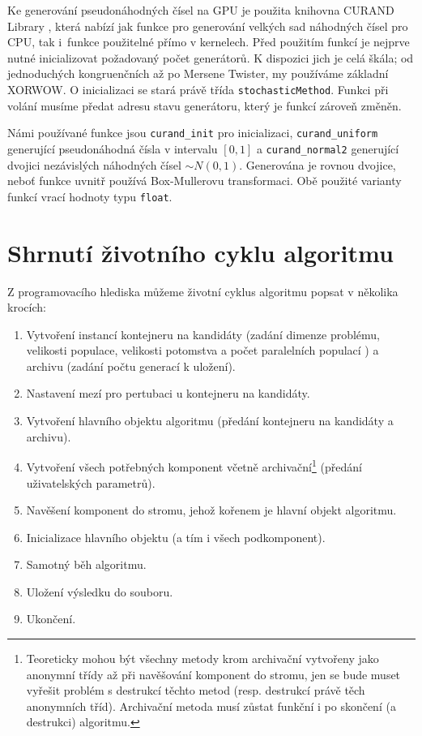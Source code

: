 Ke generování pseudonáhodných čísel na GPU je použita knihovna CURAND Library \cite{CURAND}, která nabízí jak funkce pro generování velkých sad náhodných čísel pro CPU, tak i~funkce použitelné přímo v kernelech. Před použitím funkcí je nejprve nutné inicializovat požadovaný počet generátorů. K dispozici jich je celá škála; od jednoduchých kongruenčních až po Mersene Twister, my používáme základní XORWOW. O inicializaci se stará právě třída \texttt{stochasticMethod}. Funkci při volání musíme předat adresu stavu generátoru, který je funkcí zároveň změněn.

Námi používané funkce jsou \texttt{curand\_init} pro inicializaci, \texttt{curand\_uniform} generující pseudonáhodná čísla v intervalu $[0,1]$ a \texttt{curand\_normal2} generující dvojici nezávislých náhodných čísel $\sim N(0,1)$. Generována je rovnou dvojice, neboť funkce uvnitř používá Box-Mullerovu transformaci. Obě použité varianty funkcí vrací hodnoty typu \texttt{float}.

\section{Shrnutí životního cyklu algoritmu}

Z programovacího hlediska můžeme životní cyklus algoritmu popsat v několika krocích:
\begin{enumerate}
  \item Vytvoření instancí kontejneru na kandidáty (zadání dimenze problému, velikosti populace, velikosti potomstva a počet paralelních populací ) a archivu (zadání počtu generací k uložení).
  \item Nastavení mezí pro pertubaci u kontejneru na kandidáty.
  \item Vytvoření hlavního objektu algoritmu (předání kontejneru na kandidáty a archivu).
  \item Vytvoření všech potřebných komponent včetně archivační\footnote{Teoreticky mohou být všechny metody krom archivační vytvořeny jako anonymní třídy až při navěšování komponent do stromu, jen se bude muset vyřešit problém s destrukcí těchto metod (resp. destrukcí právě těch anonymních tříd). Archivační metoda musí zůstat funkční i po skončení (a destrukci) algoritmu.} (předání uživatelských parametrů).
  \item Navěšení komponent do stromu, jehož kořenem je hlavní objekt algoritmu.
  \item Inicializace hlavního objektu (a tím i všech podkomponent).
  \item Samotný běh algoritmu.
  \item Uložení výsledku do souboru.
  \item Ukončení.
\end{enumerate}

